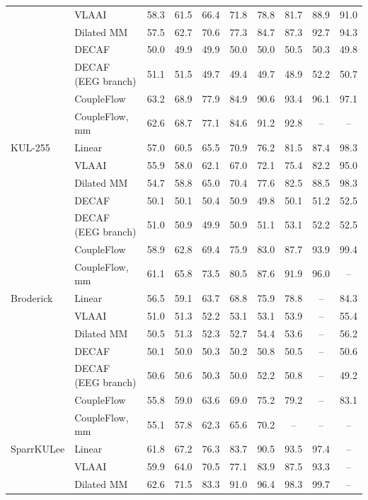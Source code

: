 \begin{tabular}{llcccccccc}
 & VLAAI & 58.3 & 61.5 & 66.4 & 71.8 & 78.8 & 81.7 & 88.9 & 91.0 \\
 & Dilated MM & 57.5 & 62.7 & 70.6 & 77.3 & 84.7 & 87.3 & 92.7 & 94.3 \\
 & DECAF & 50.0 & 49.9 & 49.9 & 50.0 & 50.0 & 50.5 & 50.3 & 49.8 \\
 & DECAF (EEG branch) & 51.1 & 51.5 & 49.7 & 49.4 & 49.7 & 48.9 & 52.2 & 50.7 \\
 & CoupleFlow & 63.2 & 68.9 & 77.9 & 84.9 & 90.6 & 93.4 & 96.1 & 97.1 \\
 & CoupleFlow, mm & 62.6 & 68.7 & 77.1 & 84.6 & 91.2 & 92.8 & -- & -- \\
\midrule
KUL-255 & Linear & 57.0 & 60.5 & 65.5 & 70.9 & 76.2 & 81.5 & 87.4 & 98.3 \\
 & VLAAI & 55.9 & 58.0 & 62.1 & 67.0 & 72.1 & 75.4 & 82.2 & 95.0 \\
 & Dilated MM & 54.7 & 58.8 & 65.0 & 70.4 & 77.6 & 82.5 & 88.5 & 98.3 \\
 & DECAF & 50.1 & 50.1 & 50.4 & 50.9 & 49.8 & 50.1 & 51.2 & 52.5 \\
 & DECAF (EEG branch) & 51.0 & 50.9 & 49.9 & 50.9 & 51.1 & 53.1 & 52.2 & 52.5 \\
 & CoupleFlow & 58.9 & 62.8 & 69.4 & 75.9 & 83.0 & 87.7 & 93.9 & 99.4 \\
 & CoupleFlow, mm & 61.1 & 65.8 & 73.5 & 80.5 & 87.6 & 91.9 & 96.0 & -- \\
\midrule
Broderick & Linear & 56.5 & 59.1 & 63.7 & 68.8 & 75.9 & 78.8 & -- & 84.3 \\
 & VLAAI & 51.0 & 51.3 & 52.2 & 53.1 & 53.1 & 53.9 & -- & 55.4 \\
 & Dilated MM & 50.5 & 51.3 & 52.3 & 52.7 & 54.4 & 53.6 & -- & 56.2 \\
 & DECAF & 50.1 & 50.0 & 50.3 & 50.2 & 50.8 & 50.5 & -- & 50.6 \\
 & DECAF (EEG branch) & 50.6 & 50.6 & 50.3 & 50.0 & 52.2 & 50.8 & -- & 49.2 \\
 & CoupleFlow & 55.8 & 59.0 & 63.6 & 69.0 & 75.2 & 79.2 & -- & 83.1 \\
 & CoupleFlow, mm & 55.1 & 57.8 & 62.3 & 65.6 & 70.2 & -- & -- & -- \\
\midrule
SparrKULee & Linear & 61.8 & 67.2 & 76.3 & 83.7 & 90.5 & 93.5 & 97.4 & -- \\
 & VLAAI & 59.9 & 64.0 & 70.5 & 77.1 & 83.9 & 87.5 & 93.3 & -- \\
 & Dilated MM & 62.6 & 71.5 & 83.3 & 91.0 & 96.4 & 98.3 & 99.7 & -- \\

\end{tabular}
